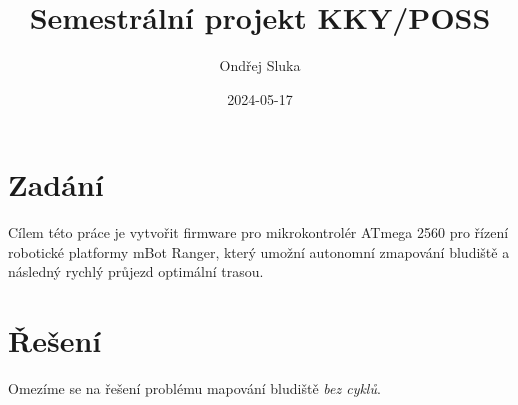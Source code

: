\documentclass[a4paper,11pt]{article}
\author{Ondřej Sluka}
\date{2024-05-17}
\title{Semestrální projekt KKY/POSS}
\begin{document}
\maketitle
\tableofcontents

\section{Zadání}
Cílem této práce je vytvořit firmware pro mikrokontrolér ATmega 2560 pro řízení
robotické platformy mBot Ranger, který umožní autonomní zmapování bludiště
a následný rychlý průjezd optimální trasou.

\section{Řešení}
Omezíme se na řešení problému mapování bludiště \emph{bez cyklů}.
\end{document}
